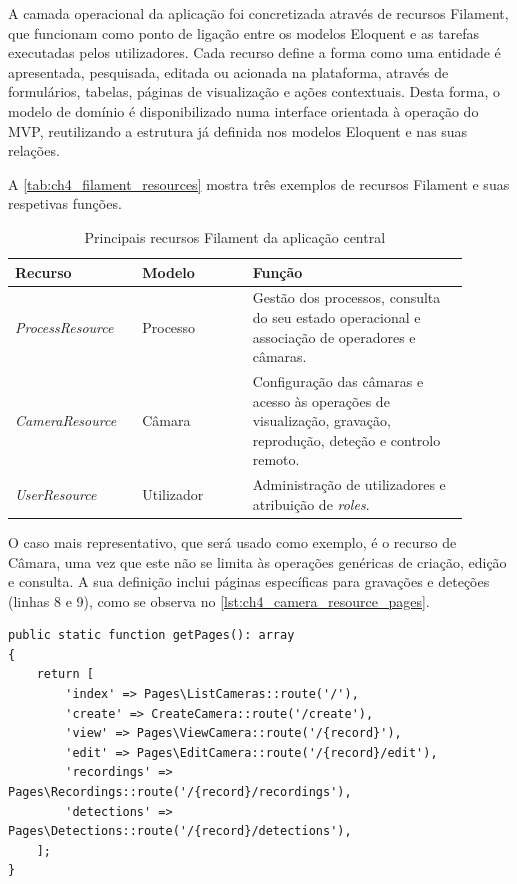 A camada operacional da aplicação foi concretizada através de recursos Filament, que funcionam como ponto de ligação entre os modelos Eloquent e as tarefas executadas pelos utilizadores. Cada recurso define a forma como uma entidade é apresentada, pesquisada, editada ou acionada na plataforma, através de formulários, tabelas, páginas de visualização e ações contextuais. Desta forma, o modelo de domínio é disponibilizado numa interface orientada à operação do \gls{MVP}, reutilizando a estrutura já definida nos modelos Eloquent e nas suas relações.

A \autoref{tab:ch4_filament_resources} mostra três exemplos de recursos Filament e suas respetivas funções.

\begin{table}[H]
    \centering
    \caption{Principais recursos Filament da aplicação central}
    \label{tab:ch4_filament_resources}
    \begin{tabular}{p{0.25\linewidth} p{0.22\linewidth} p{0.43\linewidth}}
        \toprule
        \textbf{Recurso} & \textbf{Modelo} & \textbf{Função} \\
        \midrule
        \textit{ProcessResource} & Processo & Gestão dos processos, consulta do seu estado operacional e associação de operadores e câmaras. \\
        \textit{CameraResource} & Câmara & Configuração das câmaras e acesso às operações de visualização, gravação, reprodução, deteção e controlo remoto. \\
        \textit{UserResource} & Utilizador & Administração de utilizadores e atribuição de \textit{roles}. \\
        \bottomrule
    \end{tabular}
\end{table}

O caso mais representativo, que será usado como exemplo, é o recurso de Câmara, uma vez que este não se limita às operações genéricas de criação, edição e consulta. A sua definição inclui páginas específicas para gravações e deteções (linhas 8 e 9), como se observa no \autoref{lst:ch4_camera_resource_pages}.

\begin{lstlisting}[caption={Páginas definidas no recurso de Câmara (php)},label={lst:ch4_camera_resource_pages}]
public static function getPages(): array
{
    return [
        'index' => Pages\ListCameras::route('/'),
        'create' => CreateCamera::route('/create'),
        'view' => Pages\ViewCamera::route('/{record}'),
        'edit' => Pages\EditCamera::route('/{record}/edit'),
        'recordings' => Pages\Recordings::route('/{record}/recordings'),
        'detections' => Pages\Detections::route('/{record}/detections'),
    ];
}
\end{lstlisting}


